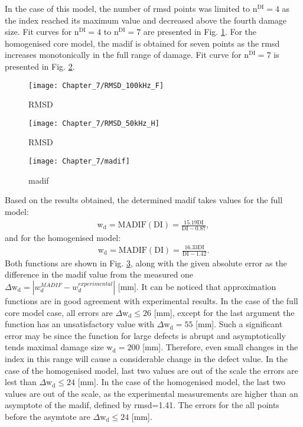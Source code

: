 In the case of this model, the number of \ac{rmsd} points was limited to \(\mathrm{n^{DI}}=4\) as the index reached its maximum value and decreased above the fourth damage size.
Fit curves for \(\mathrm{n^{DI}}=4\) to \(\mathrm{n^{DI}}=7\) are presented in Fig. \ref{fig:RMSD_F}. 
For the homogenised core model, the \ac{madif} is obtained for seven points as the \ac{rmsd} increases monotonically in the full range of damage.
Fit curve for \(\mathrm{n^{DI}}=7\) is presented in Fig. \ref{fig:RMSD_H}.
\begin{figure}[!tbh]
	\begin{center}
		\texttt{[image: Chapter\_7/RMSD\_100kHz\_F]}
	\end{center}
	\caption{RMSD}
	\label{fig:RMSD_F}
\end{figure}
\begin{figure}[!tbh]
	\begin{center}
		\texttt{[image: Chapter\_7/RMSD\_50kHz\_H]}
	\end{center}
	\caption{RMSD}
	\label{fig:RMSD_H}
\end{figure}
\begin{figure}[!tbh]
	\begin{center}
		\texttt{[image: Chapter\_7/madif]}
	\end{center}
	\caption{\ac{madif}}
	\label{fig:madif}
\end{figure}

Based on the results obtained, the determined \ac{madif} takes values for the full model:
\begin{eqnarray}
	\mathrm{w_d} = \mathrm{MADIF(DI)} = \frac{15.19\mathrm{DI}}{\mathrm{DI}-0.87},
	\label{eg:madif_full} 
\end{eqnarray}
and for the homogenised model:
\begin{eqnarray}
	\mathrm{w_d} = \mathrm{MADIF(DI)} = \frac{16.33\mathrm{DI}}{\mathrm{DI}-1.42}.
	\label{eg:madif_homog} 
\end{eqnarray}
Both functions are shown in Fig. \ref{fig:madif}, along with the given absolute error as the difference in the \ac{madif} value from the measured one \(\Delta \mathrm{w_d}=\left|w_d^{MADIF}-w_d^{experimental}\right|\) [mm].
It can be noticed that approximation functions are in good agreement with experimental results.
In the case of the full core model case, all errors are \(\Delta \mathrm{w_d}\leq26\) [mm], except for the last argument the function has an unsatisfactory value with \(\Delta \mathrm{w_d}=55\) [mm].
Such a significant error may be since the function for large defects is abrupt and asymptotically tends maximal damage size \(\mathrm{w_d}=200\) [mm]. 
Therefore, even small changes in the index in this range will cause a considerable change in the defect value.
In the case of the homogenised model, last two values are out of the scale the errors are lest than \(\Delta \mathrm{w_d}\leq24\) [mm].
In the case of the homogenised model, the last two values are out of the scale, as the experimental measurements are higher than an asymptote of the \ac{madif}, defined by \ac{rmsd}=1.41.
The errors for the all points before the asymtote are \(\Delta \mathrm{w_d}\leq24\) [mm].
